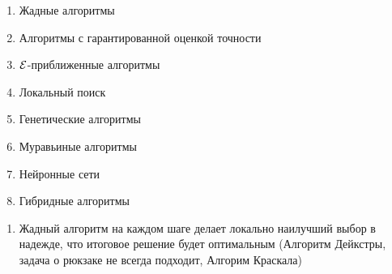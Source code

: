 \documentclass[discrete.tex]{subfiles}
\begin{document}
  \begin{example}
    \begin{enumerate}
      \item Жадные алгоритмы
      \item Алгоритмы с гарантированной оценкой точности
      \item $\mathcal{E}$-приближенные алгоритмы
      \item Локальный поиск
      \item Генетические алгоритмы
      \item Муравьиные алгоритмы
      \item Нейронные сети
      \item Гибридные алгоритмы
    \end{enumerate}

    \begin{enumerate}
      \item Жадный алгоритм на каждом шаге делает локально наилучший выбор в надежде, что итоговое решение будет оптимальным (Алгоритм Дейкстры, задача о рюкзаке не всегда подходит, Алгорим Краскала)


\end{enumerate}
\end{example}
\end{document}
